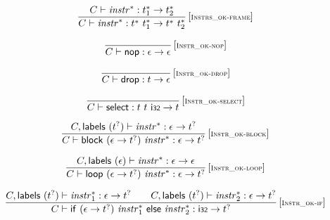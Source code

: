 \documentclass{article}
\begin{document}
$$
\begin{array}{@{}c@{}}\displaystyle
	\frac{
		C \vdash {{\mathit{instr}}^\ast} : {t_1^\ast} \rightarrow {t_2^\ast}
	}{
		C \vdash {{\mathit{instr}}^\ast} : {t^\ast}~{t_1^\ast} \rightarrow {t^\ast}~{t_2^\ast}
	} \, {[\textsc{\scriptsize Instrs\_ok{-}frame}]}
	\qquad
\end{array}
$$

\vspace{1ex}

$$
\begin{array}{@{}c@{}}\displaystyle
	\frac{
	}{
		C \vdash \mathsf{nop} : \epsilon \rightarrow \epsilon
	} \, {[\textsc{\scriptsize Instr\_ok{-}nop}]}
	\qquad
\end{array}
$$

$$
\begin{array}{@{}c@{}}\displaystyle
	\frac{
	}{
		C \vdash \mathsf{drop} : t \rightarrow \epsilon
	} \, {[\textsc{\scriptsize Instr\_ok{-}drop}]}
	\qquad
\end{array}
$$

$$
\begin{array}{@{}c@{}}\displaystyle
	\frac{
	}{
		C \vdash \mathsf{select} : t~t~\mathsf{i{\scriptstyle 32}} \rightarrow t
	} \, {[\textsc{\scriptsize Instr\_ok{-}select}]}
	\qquad
\end{array}
$$

\vspace{1ex}

$$
\begin{array}{@{}c@{}}\displaystyle
	\frac{
		C, \mathsf{labels}~({t^?}) \vdash {{\mathit{instr}}^\ast} : \epsilon \rightarrow {t^?}
	}{
		C \vdash \mathsf{block}~(\epsilon \rightarrow {t^?})~{{\mathit{instr}}^\ast} : \epsilon \rightarrow {t^?}
	} \, {[\textsc{\scriptsize Instr\_ok{-}block}]}
	\qquad
\end{array}
$$

$$
\begin{array}{@{}c@{}}\displaystyle
	\frac{
		C, \mathsf{labels}~(\epsilon) \vdash {{\mathit{instr}}^\ast} : \epsilon \rightarrow \epsilon
	}{
		C \vdash \mathsf{loop}~(\epsilon \rightarrow {t^?})~{{\mathit{instr}}^\ast} : \epsilon \rightarrow {t^?}
	} \, {[\textsc{\scriptsize Instr\_ok{-}loop}]}
	\qquad
\end{array}
$$

$$
\begin{array}{@{}c@{}}\displaystyle
	\frac{
		C, \mathsf{labels}~({t^?}) \vdash {{\mathit{instr}}_1^\ast} : \epsilon \rightarrow {t^?}
		\qquad
		C, \mathsf{labels}~({t^?}) \vdash {{\mathit{instr}}_2^\ast} : \epsilon \rightarrow {t^?}
	}{
		C \vdash \mathsf{if}~(\epsilon \rightarrow {t^?})~{{\mathit{instr}}_1^\ast}~\mathsf{else}~{{\mathit{instr}}_2^\ast} : \mathsf{i{\scriptstyle 32}} \rightarrow {t^?}
	} \, {[\textsc{\scriptsize Instr\_ok{-}if}]}
	\qquad
\end{array}
$$
\end{document}
